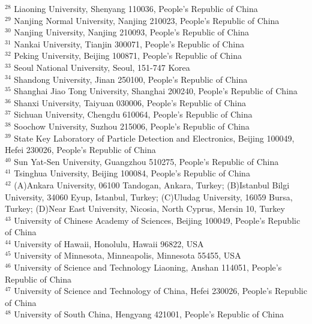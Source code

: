 \documentclass[aps,prd,twocolumn,showpacs,floatfix,byrevtex]{revtex4-1}
\begin{document}
{{$^{28}$ Liaoning University, Shenyang 110036, People's Republic of China\\
$^{29}$ Nanjing Normal University, Nanjing 210023, People's Republic of China\\
$^{30}$ Nanjing University, Nanjing 210093, People's Republic of China\\
$^{31}$ Nankai University, Tianjin 300071, People's Republic of China\\
$^{32}$ Peking University, Beijing 100871, People's Republic of China\\
$^{33}$ Seoul National University, Seoul, 151-747 Korea\\
$^{34}$ Shandong University, Jinan 250100, People's Republic of China\\
$^{35}$ Shanghai Jiao Tong University, Shanghai 200240, People's Republic of China\\
$^{36}$ Shanxi University, Taiyuan 030006, People's Republic of China\\
$^{37}$ Sichuan University, Chengdu 610064, People's Republic of China\\
$^{38}$ Soochow University, Suzhou 215006, People's Republic of China\\
$^{39}$ State Key Laboratory of Particle Detection and Electronics, Beijing 100049, Hefei 230026, People's Republic of China\\
$^{40}$ Sun Yat-Sen University, Guangzhou 510275, People's Republic of China\\
$^{41}$ Tsinghua University, Beijing 100084, People's Republic of China\\
$^{42}$ (A)Ankara University, 06100 Tandogan, Ankara, Turkey; (B)Istanbul Bilgi University, 34060 Eyup, Istanbul, Turkey; (C)Uludag University, 16059 Bursa, Turkey; (D)Near East University, Nicosia, North Cyprus, Mersin 10, Turkey\\
$^{43}$ University of Chinese Academy of Sciences, Beijing 100049, People's Republic of China\\
$^{44}$ University of Hawaii, Honolulu, Hawaii 96822, USA\\
$^{45}$ University of Minnesota, Minneapolis, Minnesota 55455, USA\\
$^{46}$ University of Science and Technology Liaoning, Anshan 114051, People's Republic of China\\
$^{47}$ University of Science and Technology of China, Hefei 230026, People's Republic of China\\
$^{48}$ University of South China, Hengyang 421001, People's Republic of China\\
}}
\end{document}
